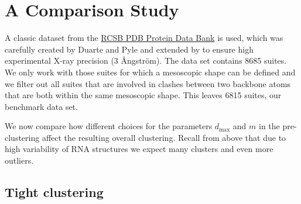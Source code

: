 \documentclass{llncs}
\begin{document}
 

\section{A Comparison Study}
\label{sec: A Comparison Study}
A classic dataset from the \href{https://www.rcsb.org/}{RCSB PDB Protein Data Bank} is used, which was carefully created by Duarte and Pyle \cite{DUARTE19981465} and extended by \cite{WADLEY2007942} to ensure high experimental X-ray precision (3 \AA{}ngstr\"om). The data set contains 8685 suites. We only work with those suites for which a mesoscopic shape can be defined and we filter out all suites that are involved in clashes between two backbone atoms that are both within the same mesoscopic shape. This leaves 6815 suites, our benchmark data set.

We now compare how different choices for the parameters $d_{\text{max}}$ and $m$ in the pre-clustering affect the resulting overall clustering. Recall from above that due to high variability of RNA structures we expect many clusters and even more outliers.

\subsection{Tight clustering}
\end{document}
